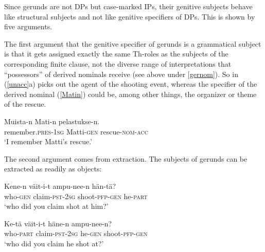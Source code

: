 \documentclass[output=paper,
modfonts
]{LSP/langsci}
\newcommand{\rf}[1]{(\ref{#1})}
\newcommand{\rfa}[2]{(\ref{#1}{#2})}
\begin{document}
Since gerunds are not DPs but case-marked IPs, their genitive subjects behave like structural
subjects and not like genitive specifiers of DPs.  This is shown by five arguments.

The first argument that the genitive specifier of gerunds is a grammatical subject is
that it gets assigned exactly the same Th-roles as the subjects of the corresponding finite
clause, not the diverse range of interpretations that ``possessors'' of derived nominals
receive (see above under \cref{gernom}).  So  in \rfa{unacc}{a} 
picks out the agent of the shooting event, whereas the specifier  of the derived
nominal \rf{Matin} could be, among other things, the organizer or theme of the rescue.
\begin{exe}
\ex\label{Matin}
  \gll Muista-n Mati-n pelastukse-n. \\
remember.\textsc{pres}-\textsc{1sg} Matti-\textsc{gen} rescue-\textsc{nom}-\textsc{acc}\\
		\glt `I remember Matti's rescue.' 
\end{exe}

The second argument comes from extraction.  The
subjects of gerunds can be extracted as readily as objects:
\begin{exe}
\ex\label{nolbc}
	\ea  \gll  Kene-n väit-i-t ampu-nee-n hän-tä?\\
		 who-\textsc{gen} claim-\textsc{pst}-\textsc{2sg} shoot-\textsc{pfp}-\textsc{gen} he-\textsc{part}\\
		\glt `who did you claim shot at him?' 
	
	\ex  \gll  Ke-tä väit-i-t häne-n       ampu-nee-n?\\
		who-\textsc{part} claim-\textsc{pst}-\textsc{2sg} he-\textsc{gen} shoot-\textsc{pfp}-\textsc{gen} \\
		\glt `who did you claim he shot at?' 
	\z
\end{exe}
\end{document}
